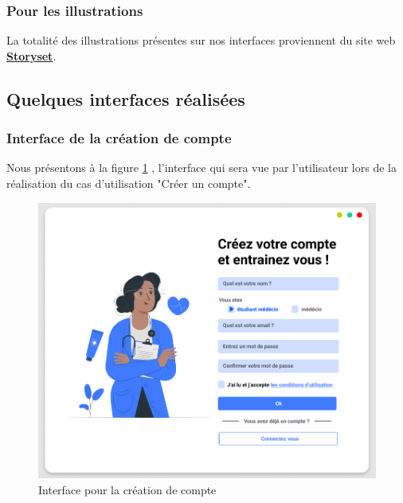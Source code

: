 \subsubsection{Pour les illustrations}
La totalité des illustrations présentes sur nos interfaces proviennent du site web \textbf{\href{https://storyset.com/}{Storyset}}.

\subsection{Quelques interfaces réalisées}
\subsubsection{Interface de la création de compte}
Nous présentons à la figure \ref{fig:in_compte}  , l'interface qui sera vue par l'utilisateur lors de la réalisation du cas d'utilisation "Créer un compte".
\begin{figure}[H]
    \centering
    \includegraphics[width=\textwidth]{figures/signup.png}
    \captionsetup{justification=centering}
    \caption{Interface pour la création de compte}
    \label{fig:in_compte}
\end{figure}

